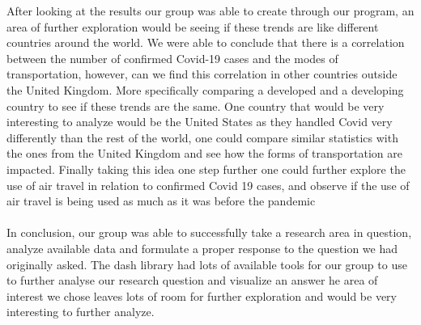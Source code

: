 \documentclass[fontsize=11pt]{article}
\begin{document}
After looking at the results our group was able to create through our program, an area of further exploration would be seeing if these trends are like different countries around the world. We were able to conclude that there is a correlation between the number of confirmed Covid-19 cases and the modes of transportation, however, can we find this correlation in other countries outside the United Kingdom. More specifically comparing a developed and a developing country to see if these trends are the same. One country that would be very interesting to analyze would be the United States as they handled Covid very differently than the rest of the world, one could compare similar statistics with the ones from the United Kingdom and see how the forms of transportation are impacted. Finally taking this idea one step further one could further explore the use of air travel in relation to confirmed Covid 19 cases, and observe if the use of air travel is being used as much as it was before the pandemic \\ \\

In conclusion, our group was able to successfully take a research area in question, analyze available data and formulate a proper response to the question we had originally asked. The dash library had lots of available tools for our group to use to further analyse our research question and visualize an answer he area of interest we chose leaves lots of room for further exploration and would be very interesting to further analyze.
\end{document}
